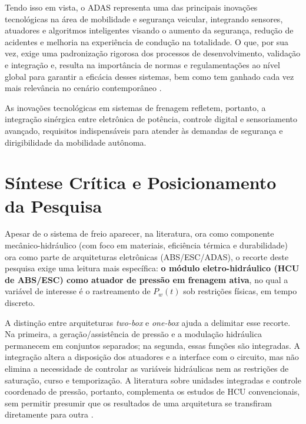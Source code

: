 Tendo isso em vista, o ADAS representa uma das principais inovações tecnológicas na área de mobilidade e segurança veicular, integrando sensores, atuadores e algoritmos inteligentes visando o aumento da segurança, redução de acidentes e melhoria na experiência de condução na totalidade. O que, por sua vez, exige uma padronização rigorosa dos processos de desenvolvimento, validação e integração e, resulta na importância de normas e regulamentações ao nível global para garantir a eficácia desses sistemas, bem como tem ganhado cada vez mais relevância no cenário contemporâneo \cite{Rudolf2011}.

As inovações tecnológicas em sistemas de frenagem refletem, portanto, a integração sinérgica entre eletrônica de potência, controle digital e sensoriamento avançado, requisitos indispensáveis para atender às demandas de segurança e dirigibilidade da mobilidade autônoma.


\section{Síntese Crítica e Posicionamento da Pesquisa}
\label{sec:estado-arte-sintese-critica}

Apesar de o sistema de freio aparecer, na literatura, ora como componente mecânico-hidráulico (com foco em materiais, eficiência térmica e durabilidade) ora como parte de arquiteturas eletrônicas (ABS/ESC/ADAS), o recorte deste pesquisa exige uma leitura mais específica: \textbf{o módulo eletro-hidráulico (HCU de ABS/ESC) como atuador de pressão em frenagem ativa}, no qual a variável de interesse é o rastreamento de $P_w(t)$ sob restrições físicas, em tempo discreto.

A distinção entre arquiteturas \textit{two-box} e \textit{one-box} ajuda a delimitar esse recorte. Na primeira, a geração/assistência de pressão e a modulação hidráulica permanecem em conjuntos separados; na segunda, essas funções são integradas. A integração altera a disposição dos atuadores e a interface com o circuito, mas não elimina a necessidade de controlar as variáveis hidráulicas nem as restrições de saturação, curso e temporização. A literatura sobre unidades integradas e controle coordenado de pressão, portanto, complementa os estudos de HCU convencionais, sem permitir presumir que os resultados de uma arquitetura se transfiram diretamente para outra \cite{Feigel2016, Linhoff2026, HouhuaJing2022, PressureCoordinatedControl2023}.

